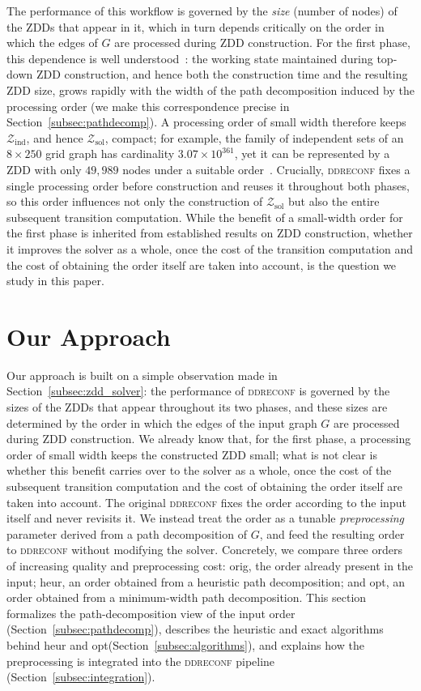 \documentclass[conference]{IEEEtran}
\newcommand{\zind}{\mathcal{Z}_{\mathrm{ind}}}
\newcommand{\zsol}{\mathcal{Z}_{\mathrm{sol}}}
\newcommand{\OrigDecom}{\textsf{orig}\xspace}
\newcommand{\HeurDecom}{\textsf{heur}\xspace}
\newcommand{\OptDecom}{\textsf{opt}\xspace}
\begin{document}
The performance of this workflow is governed by the \emph{size} (number of
nodes) of the ZDDs that appear in it, which in turn depends critically on the
order in which the edges of $G$ are processed during ZDD construction. For the
first phase, this dependence is well understood~\cite{inoue16}: the working state
maintained during top-down ZDD construction, and hence both the construction
time and the resulting ZDD size, grows rapidly with the width of the path
decomposition induced by the processing order (we make this correspondence
precise in Section~\ref{subsec:pathdecomp}). A processing order of small width
therefore keeps $\zind$, and hence $\zsol$, compact; for example, the family of
independent sets of an $8 \times 250$ grid graph has cardinality
$3.07 \times 10^{361}$, yet it can be represented by a ZDD with only $49{,}989$
nodes under a suitable order~\cite{ItoKNSSTT23}. Crucially, \textsc{ddreconf}
fixes a single processing order before construction and reuses it throughout
both phases, so this order influences not only the construction of $\zsol$ but
also the entire subsequent transition computation. While the benefit of a
small-width order for the first phase is inherited from established results on
ZDD construction, whether it improves the solver as a whole, once the cost of
the transition computation and the cost of obtaining the order itself are taken
into account, is the question we study in this paper.

\section{Our Approach}
\label{sec:approach}

Our approach is built on a simple observation made in
Section~\ref{subsec:zdd_solver}: the performance of \textsc{ddreconf} is governed
by the sizes of the ZDDs that appear throughout its two phases, and these sizes
are determined by the order in which the edges of the input graph $G$ are
processed during ZDD construction. We already know that, for the first phase, a
processing order of small width keeps the constructed ZDD small; what is not
clear is whether this benefit carries over to the solver as a whole, once the
cost of the subsequent transition computation and the cost of obtaining the
order itself are taken into account. The original \textsc{ddreconf} fixes the
order according to the input itself and never revisits it. We instead treat the
order as a tunable \emph{preprocessing} parameter derived from a path
decomposition of $G$, and feed the resulting order to \textsc{ddreconf} without
modifying the solver. Concretely, we compare three orders of increasing quality
and preprocessing cost: \OrigDecom, the order already present in the input;
\HeurDecom, an order obtained from a heuristic path decomposition; and
\OptDecom, an order obtained from a minimum-width path decomposition. This
section formalizes the path-decomposition view of the input order
(Section~\ref{subsec:pathdecomp}), describes the heuristic and exact algorithms
behind \HeurDecom and \OptDecom (Section~\ref{subsec:algorithms}), and explains
how the preprocessing is integrated into the \textsc{ddreconf} pipeline
(Section~\ref{subsec:integration}).
\end{document}
